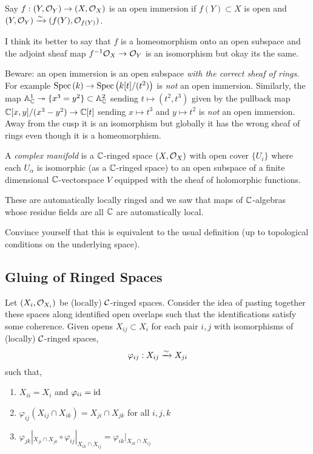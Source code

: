 \documentclass[12pt]{article}
\begin{document}
\begin{defn}
Say $f : (Y, \mathcal{O}_{Y}) \to (X, \mathcal{O}_{X})$ is an open immersion if $f(Y) \subset X$ is open and $(Y, \mathcal{O}_{Y}) \xrightarrow{\sim} (f(Y), \mathcal{O}_{f(Y)})$. 
\end{defn}

\begin{rmk}
I think its better to say that $f$ is a homeomorphism onto an open subspace and the adjoint sheaf map $f^{-1} \mathcal{O}_{X} \to \mathcal{O}_{Y}$ is an isomorphism but okay its the same.
\end{rmk}

\begin{rmk}
Beware: an open immersion is an open subspace \textit{with the correct sheaf of rings}. For example $\mathrm{Spec}\left( k \right) \to \mathrm{Spec}\left( k[t]/(t^2) \right)$ is \textit{not} an open immersion. Similarly, the map $\mathbb{A}^1_{\mathbb{C}} \twoheadrightarrow \{ x^3 = y^2 \} \subset \mathbb{A}^2_{\mathbb{C}}$ sending $t \mapsto (t^2, t^3)$ given by the pullback map $\mathbb{C}[x,y]/(x^3 - y^2) \to \mathbb{C}[t]$ sending $x \mapsto t^3$ and $y \mapsto t^2$ is \textit{not} an open immersion. Away from the cusp it is an isomorphism but globally it has the wrong sheaf of rings even though it is a homeomorphism.
\end{rmk}

\begin{defn}
A \textit{complex manifold} is a $\mathbb{C}$-ringed space $(X, \mathcal{O}_{X})$ with open cover $\{ U_i \}$ where each $U_\alpha$ is isomorphic (as a $\mathbb{C}$-ringed space) to an open subspace of a finite dimensional $\mathbb{C}$-vectorspace $V$ equipped with the sheaf of holomorphic functions.
\end{defn}

\begin{rmk}
These are automatically locally ringed and we saw that maps of $\mathbb{C}$-algebras whose residue fields are all $\mathbb{C}$ are automatically local.
\end{rmk}

\begin{rmk}
Convince yourself that this is equivalent to the usual definition (up to topological conditions on the underlying space). 
\end{rmk}

\subsection{Gluing of Ringed Spaces}

Let $(X_i, \mathcal{O}_{X_i})$ be (locally) $\mathcal{C}$-ringed spaces. Consider the idea of pasting together these spaces along identified open overlaps such that the identifications satisfy some coherence. Given opens $X_{ij} \subset X_i$ for each pair $i,j$ with isomorphisms of (locally) $\mathcal{C}$-ringed spaces,
\[ \varphi_{ij} : X_{ij} \xrightarrow{\sim} X_{ji} \]
such that,
\begin{enumerate}
\item $X_{ii} = X_i$ and $\varphi_{ii} = \mathrm{id}$
\item $\varphi_{ij}(X_{ij} \cap X_{ik}) = X_{ji} \cap X_{jk}$ for all $i,j,k$
\item $\varphi_{jk}|_{X_{ji} \cap X_{jk}} \circ \varphi_{ij}|_{X_{ik} \cap X_{ij}} = \varphi_{ik}|_{X_{ik} \cap X_{ij}}$
\end{enumerate}
\end{document}
